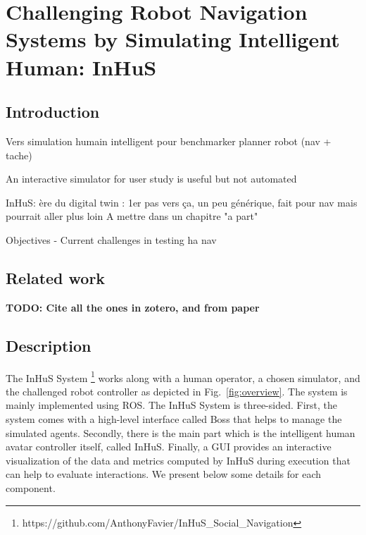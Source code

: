 \ifdefined{}
\else
\setcounter{chapter}{5} %
\dominitoc
\faketableofcontents
\fi

\chapter{Challenging Robot Navigation Systems by Simulating Intelligent Human: InHuS}
\label{chap:6}
\minitoc

\section{Introduction}
Vers simulation humain intelligent pour benchmarker planner robot (nav + tache)

An interactive simulator for user study is useful but not automated

InHuS:
ère du digital twin : 1er pas vers ça, un peu générique, fait pour nav mais pourrait aller plus loin
A mettre dans un chapitre "a part"

Objectives - Current challenges in testing ha nav

\section{Related work}

\textbf{TODO: Cite all the ones in zotero, and from paper}

\section{Description}
 
The InHuS System%
\footnote{https://github.com/AnthonyFavier/InHuS\_Social\_Navigation}
works along with a human operator, a chosen simulator, and the challenged robot controller as depicted in Fig.~\ref{fig:overview}. The system is mainly implemented using ROS. The InHuS  System is three-sided. First, the system comes with a high-level interface called Boss that helps to manage the simulated agents. Secondly, there is the main part which is the intelligent human avatar controller itself, called InHuS.
Finally, a GUI provides an interactive visualization of the data and metrics computed by InHuS during execution that can help to evaluate interactions. We present below some details for each component.

